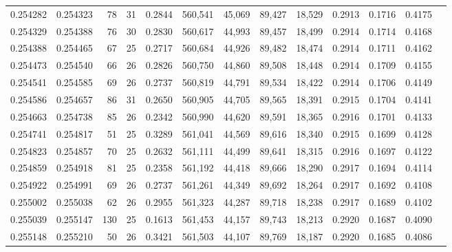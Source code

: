 \begin{tabular}{rrrrrrrrrrrrr}
0.254282 & 0.254323 &  78 &  31 &                                     0.2844 & 560,541 &  45,069 &  89,427 &  18,529 & 0.2913 & 0.1716 & 0.4175 \\
0.254329 & 0.254388 &  76 &  30 &                                     0.2830 & 560,617 &  44,993 &  89,457 &  18,499 & 0.2914 & 0.1714 & 0.4168 \\
0.254388 & 0.254465 &  67 &  25 &                                     0.2717 & 560,684 &  44,926 &  89,482 &  18,474 & 0.2914 & 0.1711 & 0.4162 \\
0.254473 & 0.254540 &  66 &  26 &                                     0.2826 & 560,750 &  44,860 &  89,508 &  18,448 & 0.2914 & 0.1709 & 0.4155 \\
0.254541 & 0.254585 &  69 &  26 &                                     0.2737 & 560,819 &  44,791 &  89,534 &  18,422 & 0.2914 & 0.1706 & 0.4149 \\
0.254586 & 0.254657 &  86 &  31 &                                     0.2650 & 560,905 &  44,705 &  89,565 &  18,391 & 0.2915 & 0.1704 & 0.4141 \\
0.254663 & 0.254738 &  85 &  26 &                                     0.2342 & 560,990 &  44,620 &  89,591 &  18,365 & 0.2916 & 0.1701 & 0.4133 \\
0.254741 & 0.254817 &  51 &  25 &                                     0.3289 & 561,041 &  44,569 &  89,616 &  18,340 & 0.2915 & 0.1699 & 0.4128 \\
0.254823 & 0.254857 &  70 &  25 &                                     0.2632 & 561,111 &  44,499 &  89,641 &  18,315 & 0.2916 & 0.1697 & 0.4122 \\
0.254859 & 0.254918 &  81 &  25 &                                     0.2358 & 561,192 &  44,418 &  89,666 &  18,290 & 0.2917 & 0.1694 & 0.4114 \\
0.254922 & 0.254991 &  69 &  26 &                                     0.2737 & 561,261 &  44,349 &  89,692 &  18,264 & 0.2917 & 0.1692 & 0.4108 \\
0.255002 & 0.255038 &  62 &  26 &                                     0.2955 & 561,323 &  44,287 &  89,718 &  18,238 & 0.2917 & 0.1689 & 0.4102 \\
0.255039 & 0.255147 & 130 &  25 &                                     0.1613 & 561,453 &  44,157 &  89,743 &  18,213 & 0.2920 & 0.1687 & 0.4090 \\
0.255148 & 0.255210 &  50 &  26 &                                     0.3421 & 561,503 &  44,107 &  89,769 &  18,187 & 0.2920 & 0.1685 & 0.4086 \\

\end{tabular}
